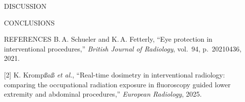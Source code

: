 \documentclass{article}
\newcommand{\smallfont}   {\fontsize{24}{30}\selectfont}   %
\newlength{\colgap}\setlength{\colgap}{1.6cm}           %
\newlength{\colC}  \setlength{\colC}{\textwidth}
\newlength{\rowgap}   \setlength{\rowgap}{1.6cm}    %
\newlength{\rowtwohgt}\setlength{\rowtwohgt}{\textheight}
\newlength{\dishgt}\setlength{\dishgt}{21cm}
\newlength{\refhgt}\setlength{\refhgt}{13cm}
\newlength{\conhgt}\setlength{\conhgt}{\rowtwohgt}
\newcommand{\topcol}{\vspace{0pt}}
\newcommand{\blockgap}{\par\vspace{\dimexpr\rowgap-\baselineskip\relax}}
\begin{document}
\hspace{\colgap}%
\begin{minipage}[t]{\colC}\topcol

  \begin{doriblock}[height=\dishgt]{DISCUSSION}


  \end{doriblock}

  \blockgap

  \begin{doriblock}[height=\conhgt]{CONCLUSIONS}


  \end{doriblock}

  \blockgap

  \begin{doriblock}[height=\refhgt]{REFERENCES}
    \smallfont
  [1] B.\,A. Schueler and K.\,A. Fetterly, ``Eye protection in interventional
procedures,'' \emph{British Journal of Radiology}, vol.~94, p.~20210436, 2021.
 
[2] K. Kromp\ss{}a\ss{} \emph{et al.}, ``Real-time dosimetry in interventional
radiology: comparing the occupational radiation exposure in fluoroscopy guided
lower extremity and abdominal procedures,'' \emph{European Radiology}, 2025.\

  \end{doriblock}

\end{minipage}
\end{document}
